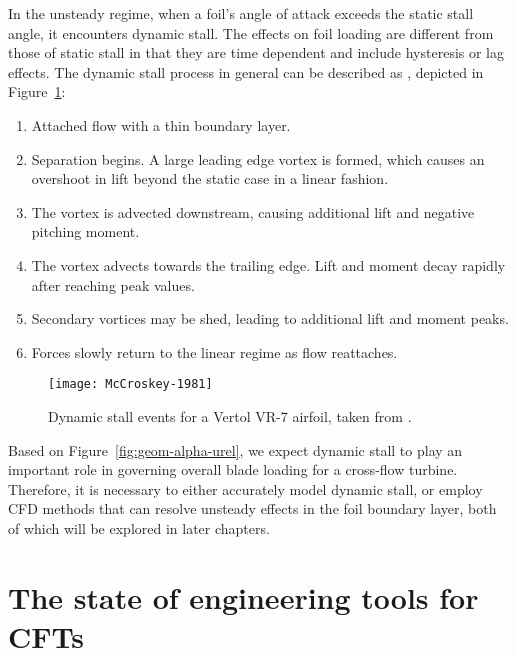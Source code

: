 In the unsteady regime, when a foil's angle of attack exceeds the static stall
angle, it encounters dynamic stall. The effects on foil loading are different
from those of static stall in that they are time dependent and include
hysteresis or lag effects. The dynamic stall process in general can be described
as \cite{McCroskey1981}, depicted in Figure~\ref{fig:McCroskey}:
\begin{enumerate}
    \item Attached flow with a thin boundary layer.

    \item Separation begins. A large leading edge vortex is formed, which causes
    an overshoot in lift beyond the static case in a linear fashion.

    \item The vortex is advected downstream, causing additional lift and
    negative pitching moment.

    \item The vortex advects towards the trailing edge. Lift and moment decay
    rapidly after reaching peak values.

    \item Secondary vortices may be shed, leading to additional lift and moment
    peaks.

    \item Forces slowly return to the linear regime as flow reattaches.
\end{enumerate}

\begin{figure}
    \centering

    \texttt{[image: McCroskey-1981]}

    \caption{Dynamic stall events for a Vertol VR-7 airfoil, taken from
        \cite{McCroskey1981}.}

    \label{fig:McCroskey}
\end{figure}

Based on Figure~\ref{fig:geom-alpha-urel}, we expect dynamic stall to play an
important role in governing overall blade loading for a cross-flow turbine.
Therefore, it is necessary to either accurately model dynamic stall, or employ
CFD methods that can resolve unsteady effects in the foil boundary layer, both
of which will be explored in later chapters.


\section{The state of engineering tools for CFTs}

